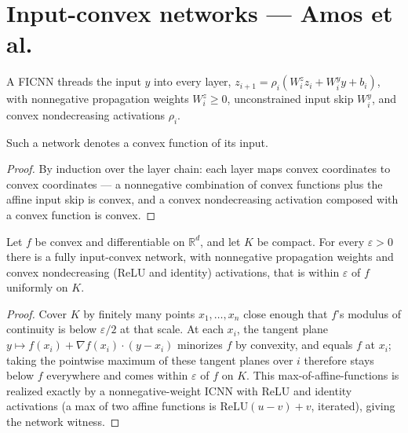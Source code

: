 \chapter{Input-convex networks --- Amos et al.}

\begin{definition}\label{def:icnn}
  A FICNN threads the input $y$ into every layer, $z_{i+1}=\rho_i(W^z_i z_i + W^y_i y + b_i)$, with
  nonnegative propagation weights $W^z_i\ge 0$, unconstrained input skip $W^y_i$, and convex
  nondecreasing activations $\rho_i$.
\end{definition}

\begin{theorem}\label{thm:icnn-convex}
  \leanok
  Such a network denotes a convex function of its input.
\end{theorem}
\begin{proof}\leanok
  By induction over the layer chain: each layer maps convex coordinates to convex coordinates ---
  a nonnegative combination of convex functions plus the affine input skip is convex, and a convex
  nondecreasing activation composed with a convex function is convex.
\end{proof}

\begin{theorem}\label{thm:icnn-uap}
  \leanok
  Let $f$ be convex and differentiable on $\mathbb{R}^d$, and let $K$ be compact. For every
  $\varepsilon>0$ there is a fully input-convex network, with nonnegative propagation weights and
  convex nondecreasing (ReLU and identity) activations, that is within $\varepsilon$ of $f$
  uniformly on $K$.
\end{theorem}
\begin{proof}\leanok
  Cover $K$ by finitely many points $x_1,\dots,x_n$ close enough that $f$'s modulus of continuity
  is below $\varepsilon/2$ at that scale. At each $x_i$, the tangent plane
  $y \mapsto f(x_i) + \nabla f(x_i)\cdot(y-x_i)$ minorizes $f$ by convexity, and equals $f$ at
  $x_i$; taking the pointwise maximum of these tangent planes over $i$ therefore stays below $f$
  everywhere and comes within $\varepsilon$ of $f$ on $K$. This max-of-affine-functions is realized
  exactly by a nonnegative-weight ICNN with ReLU and identity activations (a max of two affine
  functions is
  $\mathrm{ReLU}(u-v)+v$, iterated), giving the network witness.
\end{proof}
